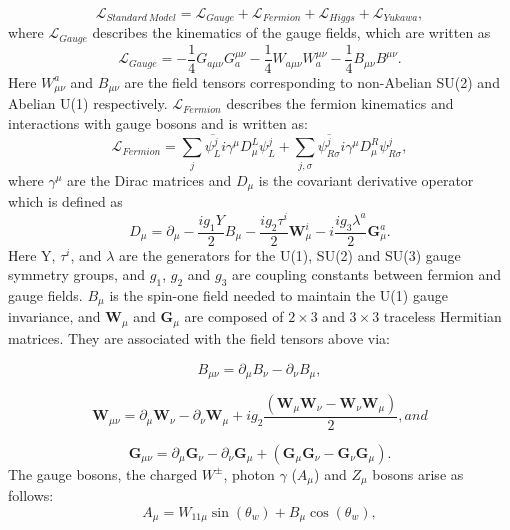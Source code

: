 \begin{equation}
  \mathcal{L}_{Standard\ Model}= \mathcal{L}_{Gauge}+ \mathcal{L}_{Fermion}+ \mathcal{L}_{Higgs}+ \mathcal{L}_{Yukawa},
 \label{eq:Standard Modelall}
\end{equation}
where $\mathcal{L}_{Gauge}$ describes the kinematics of the gauge fields, which are written as
\begin{equation}
  \mathcal{L}_{Gauge}= -\frac{1}{4}G_{a\mu\nu}G^{\mu\nu}_a - \frac{1}{4}W_{a\mu\nu}W^{\mu\nu}_a - \frac{1}{4}B_{\mu\nu}B^{\mu\nu}.
\end{equation}
Here $W_{\mu\nu}^a$ and $B_{\mu\nu}$ are the field tensors corresponding to non-Abelian SU(2) and Abelian U(1) respectively.
$\mathcal{L}_{Fermion}$ describes the fermion kinematics and interactions with gauge bosons and is written as:
\begin{equation}
  \mathcal{L}_{Fermion}=\sum_j \overline{\psi^j_L}i\gamma^\mu D^L_\mu \psi^j_L + \sum_{j, \sigma} \overline{\psi^j_{R\sigma}}i\gamma^{\mu}D^R_{\mu}\psi^j_{R\sigma},
  \label{eq:smf}
\end{equation}
where $\gamma^{\mu}$ are the Dirac matrices and $D_{\mu}$ is the covariant derivative operator which is defined as 
\begin{equation}
  D_\mu=\partial_\mu-\frac{ig_1Y}{2}B_\mu-\frac{ig_2\tau^i}{2}\mathbf{W}^i_\mu-i\frac{ig_3\lambda^a}{2}\mathbf{G}^a_\mu.
  \label{eq:dirac}
\end{equation}
Here Y, $\tau^i$, and $\lambda$ are the generators for the U(1), SU(2) and SU(3) gauge symmetry groups, and $g_1$, $g_2$ and $g_3$ 
are coupling constants between fermion and gauge fields. 
$B_\mu$ is the spin-one field needed to maintain the U(1) gauge invariance,
and $\mathbf{W}_\mu$ and $\mathbf{G}_\mu$ are composed of $2\times3$ and $3\times3$ traceless Hermitian matrices.
They are associated with the field tensors above via:


\begin{equation*}
 B_{\mu\nu}=\partial_\mu B_\nu-\partial_\nu B_\mu,
\end{equation*}


\begin{equation*}
 \mathbf{W}_{\mu\nu}=\partial_\mu\mathbf{W}_\nu-\partial_\nu\mathbf{W}_\mu+ig_2\frac{\left(\mathbf{W}_\mu\mathbf{W}_\nu-\mathbf{W}_\nu\mathbf{W}_\mu\right)}{2}, and 
\end{equation*}


\begin{equation*}
 \mathbf{G}_{\mu\nu}=\partial_\mu\mathbf{G}_\nu-\partial_\nu\mathbf{G}_\mu+\left(\mathbf{G}_\mu\mathbf{G}_\nu-\mathbf{G}_\nu\mathbf{G}_\mu\right).
\end{equation*}
The gauge bosons, the charged $W^{\pm}$, photon $\gamma$ ($A_\mu$) and $Z_\mu$ bosons arise as follows:
\begin{equation*}
 A_\mu=W_{11\mu}\sin\left(\theta_w\right)+B_\mu\cos\left(\theta_w\right),
\end{equation*}


